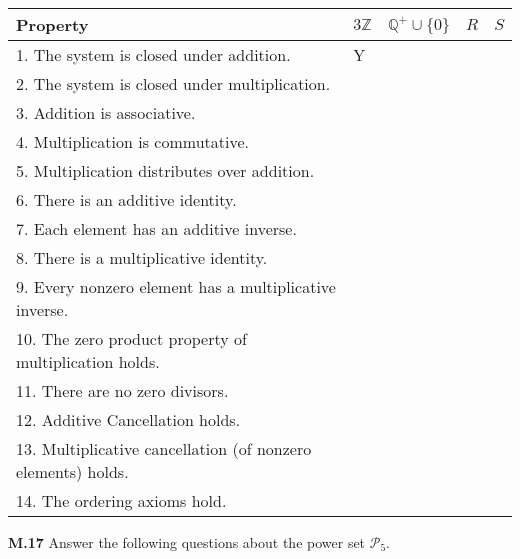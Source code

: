 \documentclass[addpoints]{exam}
\begin{document}
\begin{questions}
\begin{tabular}{lllll}
\toprule
Property                                                                       & $3\mathbb{Z}$ & $\mathbb{Q}^+\cup\{0\}$ & $R$ & $S$\\ \midrule
1. The system is closed under addition.   &  Y  &   &   &  \\ 
2. The system is closed under multiplication. &   &   &   &  \\  
3. Addition is associative.  &   &   &   &  \\ 
4. Multiplication is commutative.  &   &   &   &  \\ 
5. Multiplication distributes over addition.  &   &   &   &  \\  
6. There is an additive identity. &   &   &   &  \\ 
7. Each element has an additive inverse. &   &   &   &  \\  
8. There is a multiplicative identity. &   &   &   &  \\ 
9. Every nonzero element has a multiplicative inverse. &   &   &   &  \\ 
10. The zero product property of multiplication holds. &   &   &   &  \\ 
11. There are no zero divisors. &   &   &   &  \\ 
12. Additive Cancellation holds. &   &   &   &  \\  
13. Multiplicative cancellation (of nonzero elements) holds. &   &   &   &  \\ 
14. The ordering axioms hold.&   &   &   &  \\  \bottomrule
\end{tabular}


\question \textbf{M.17}
Answer the following questions about the power set $\mathcal{P}_5$.





\end{questions}
\end{document}
